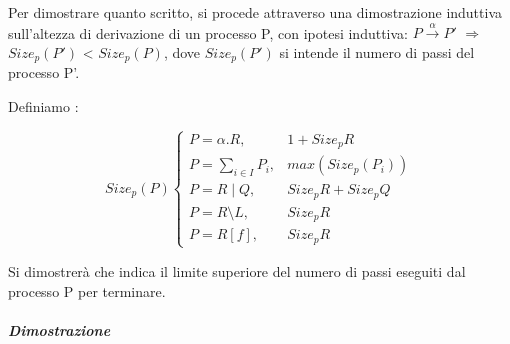 Per dimostrare quanto scritto, si procede attraverso una dimostrazione induttiva sull'altezza di derivazione di un processo P, con ipotesi induttiva: \(P \overset{\alpha}\rightarrow P'\) $\Rightarrow$ $Size_{p}(P')$ < $Size_{p}(P)$, dove $Size_{p}(P')$ si intende il numero di passi del processo P'.

Definiamo :

\[
Size_{p}(P)
\begin{cases}
P=\alpha.R,     & 1+Size_{p}{R}                \\
P=\displaystyle\sum_{i\in I}^{}P_{i},          & max(Size_{p}(P_{i})) \\
P=R\mid Q,      & Size_{p}{R}+Size_{p}{Q}       \\
P=R\setminus L, & Size_{p}{R}                  \\
P=R[f],         & Size_{p}{R}
\end{cases}
\]

Si dimostrerà che  indica il limite superiore del numero di passi eseguiti dal processo P per terminare.

\subparagraph{Dimostrazione} \mbox{}

